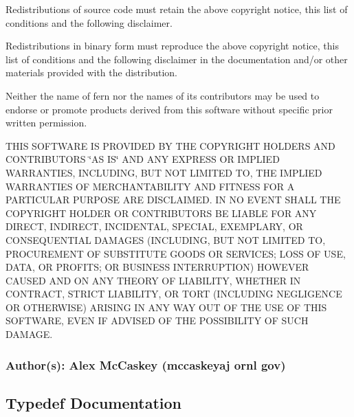 Redistributions of source code must retain the above copyright notice, this list of conditions and the following disclaimer.

Redistributions in binary form must reproduce the above copyright notice, this list of conditions and the following disclaimer in the documentation and/or other materials provided with the distribution.

Neither the name of fern nor the names of its contributors may be used to endorse or promote products derived from this software without specific prior written permission.

T\+H\+IS S\+O\+F\+T\+W\+A\+RE IS P\+R\+O\+V\+I\+D\+ED BY T\+HE C\+O\+P\+Y\+R\+I\+G\+HT H\+O\+L\+D\+E\+RS A\+ND C\+O\+N\+T\+R\+I\+B\+U\+T\+O\+RS \char`\"{}\+A\+S I\+S\char`\"{} A\+ND A\+NY E\+X\+P\+R\+E\+SS OR I\+M\+P\+L\+I\+ED W\+A\+R\+R\+A\+N\+T\+I\+ES, I\+N\+C\+L\+U\+D\+I\+NG, B\+UT N\+OT L\+I\+M\+I\+T\+ED TO, T\+HE I\+M\+P\+L\+I\+ED W\+A\+R\+R\+A\+N\+T\+I\+ES OF M\+E\+R\+C\+H\+A\+N\+T\+A\+B\+I\+L\+I\+TY A\+ND F\+I\+T\+N\+E\+SS F\+OR A P\+A\+R\+T\+I\+C\+U\+L\+AR P\+U\+R\+P\+O\+SE A\+RE D\+I\+S\+C\+L\+A\+I\+M\+ED. IN NO E\+V\+E\+NT S\+H\+A\+LL T\+HE C\+O\+P\+Y\+R\+I\+G\+HT H\+O\+L\+D\+ER OR C\+O\+N\+T\+R\+I\+B\+U\+T\+O\+RS BE L\+I\+A\+B\+LE F\+OR A\+NY D\+I\+R\+E\+CT, I\+N\+D\+I\+R\+E\+CT, I\+N\+C\+I\+D\+E\+N\+T\+AL, S\+P\+E\+C\+I\+AL, E\+X\+E\+M\+P\+L\+A\+RY, OR C\+O\+N\+S\+E\+Q\+U\+E\+N\+T\+I\+AL D\+A\+M\+A\+G\+ES (I\+N\+C\+L\+U\+D\+I\+NG, B\+UT N\+OT L\+I\+M\+I\+T\+ED TO, P\+R\+O\+C\+U\+R\+E\+M\+E\+NT OF S\+U\+B\+S\+T\+I\+T\+U\+TE G\+O\+O\+DS OR S\+E\+R\+V\+I\+C\+ES; L\+O\+SS OF U\+SE, D\+A\+TA, OR P\+R\+O\+F\+I\+TS; OR B\+U\+S\+I\+N\+E\+SS I\+N\+T\+E\+R\+R\+U\+P\+T\+I\+ON) H\+O\+W\+E\+V\+ER C\+A\+U\+S\+ED A\+ND ON A\+NY T\+H\+E\+O\+RY OF L\+I\+A\+B\+I\+L\+I\+TY, W\+H\+E\+T\+H\+ER IN C\+O\+N\+T\+R\+A\+CT, S\+T\+R\+I\+CT L\+I\+A\+B\+I\+L\+I\+TY, OR T\+O\+RT (I\+N\+C\+L\+U\+D\+I\+NG N\+E\+G\+L\+I\+G\+E\+N\+CE OR O\+T\+H\+E\+R\+W\+I\+SE) A\+R\+I\+S\+I\+NG IN A\+NY W\+AY O\+UT OF T\+HE U\+SE OF T\+H\+IS S\+O\+F\+T\+W\+A\+RE, E\+V\+EN IF A\+D\+V\+I\+S\+ED OF T\+HE P\+O\+S\+S\+I\+B\+I\+L\+I\+TY OF S\+U\+CH D\+A\+M\+A\+GE.

\subsubsection*{Author(s)\+: Alex Mc\+Caskey (mccaskeyaj  ornl  gov) }

\subsection{Typedef Documentation}
\mbox{\label{a00171_a1bf491fd1c876e2808648b2fd291e3dd}} 
